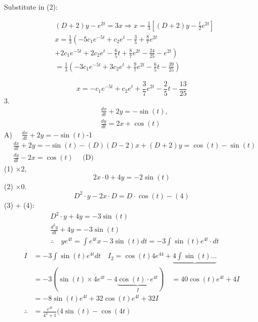 \documentclass[12pt, a4paper]{article}
\begin{document}
	Substitute in (2):

$$
\begin{aligned}
	 & (D+2) y-e^{2 t}=3 x \Rightarrow x=\frac{1}{3}\left[(D+2) y-\frac{t}{2} e^{2 t}\right]                    \\
	 & x=\frac{1}{3}\left(-5 c_{1} e^{-5 t}+c_{2} e^{t}-\frac{3}{5}+\frac{8}{7} e^{2 t}\right.                  \\
	 & \left.+2 c_{1} e^{-5 t}+2 c_{2} e^{t}-\frac{6}{5} t+\frac{8}{7} e^{2 t}-\frac{24}{25}-e^{2 t}\right)     \\
	 & =\frac{1}{3}\left(-3 c_{1} e^{-5 t}+3 c_{2} e^{t}+\frac{9}{7} e^{2 t}-\frac{6}{5} t-\frac{39}{25}\right)
\end{aligned}
$$

$$
x=-c_1 e^{-5 t}+c_2 e^t+\frac{3}{7} e^{2 t}-\frac{2}{5} t-\frac{13}{25}
$$
	3.
$$
\begin{aligned}
	 & \frac{d x}{d t}+2 y=-\sin(t), \\
	 & \frac{d y}{d t}=2 x+\cos(t)
\end{aligned}
$$
	A) $\quad \frac{d x}{d t}+2 y=-\sin(t)$-1
$$
\begin{aligned}
	 & \frac{d x}{d t}+2 y=-\sin(t)-(D)(D-2) x+(D+2) y=\cos(t)-\sin(t) \\
	 & \frac{d y}{d t}-2 x=\cos(t) \quad \text{ (D) }
\end{aligned}
$$
	(1) $\times 2$,
$$
2 x \cdot 0+4 y=-2 \sin(t)
$$
	(2) $\times 0$.
$$
D^2 \cdot y-2 x \cdot D=D \cdot \cos(t)-(4)
$$
	(3) + (4):
$$
\begin{aligned}
	 & D^2 \cdot y+4 y=-3 \sin(t)                                                                \\
	 & \frac{d^2 y}{d t}+4 y=-3 \sin(t)                                                          \\
	 & \therefore \quad y e^{4 t}=\int e^{4 t} x-3 \sin(t) d t=-3 \int \sin(t) e^{4 t} \cdot d t \\
	 &
\end{aligned}
$$
$$
\begin{aligned}
	I          & =-3 \int \sin(t) e^{4 t} d t \quad I_2=\cos(t) 4 e^{44}+\underbrace{4 \int \sin(t) \ldots}        \\
	           & =-3(\sin(t) \times 4 e^{4 t}-4 \underbrace{\cos(t) \cdot e^{4 t}}_I) \quad=40 \cos(t) e^{4 t}+4 I \\
	           & =-8 \sin(t) e^{4 t}+32 \cos(t) e^{4 t}+32 I                                                       \\
	\therefore & =\frac{e^{4 t}}{4^2+1}(4 \sin(t)-\cos(4 t)
\end{aligned}
$$
\end{document}
